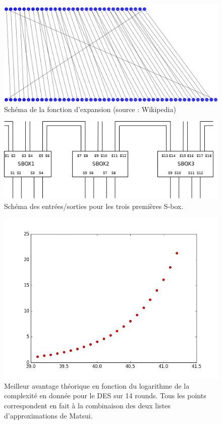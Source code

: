 \documentclass{scrartcl}
\begin{document}
\begin{figure}[H]
	\centering
	\includegraphics[scale=0.3]{exp}
	\caption{Schéma de la fonction d'expansion (source : Wikipedia)}
	\label{fig:exp}
\end{figure}

\begin{figure}
	\centering
	\includegraphics[scale=0.7]{schemainout}
	\caption{Schéma des entrées/sorties pour les trois premières S-box.}
	\label{fig:inout}
\end{figure}

\begin{figure}
	\centering
	\includegraphics[scale=0.5]{fig1}
	\caption{Meilleur avantage théorique en fonction du logarithme de la complexité en donnée pour le DES sur 14 rounds. Tous les
	points correspondent en fait à la combinaison des deux listes d'approximations de Matsui.}
	\label{reftheo}
\end{figure}
\end{document}
